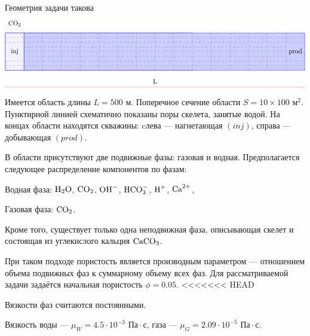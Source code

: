 \documentclass[14pt,a4paper]{extarticle}
\begin{document}
Геометрия задачи такова
$$
\tikz {
\draw (0,0) --  +(10,0) -- +(10,2) -- +(0, 2) -- +(0,0);
\filldraw[fill=blue!20!white, draw=blue] (1,0) --  (16,0) -- (16,2) -- (1, 2) -- (1,0);
\filldraw[fill=blue!5!white, draw=blue] (0,0) --  (1,0) -- (1,2) -- (0, 2) -- (0,0);
\draw[dashed, gray] (0,0.25) -- (16,0.25); 
\draw[dashed, gray] (0,0.5) -- (16,0.5); 
\draw[dashed, gray] (1,0.75) -- (15,0.75); 
\draw[dashed, gray] (1, 1) -- (15, 1);
\draw[dashed, gray] (1,1.25) -- (15,1.25); 
\draw[dashed, gray] (0,1.5) -- (16,1.5); 
\draw[dashed, gray] (0,1.75) -- (16,1.75);
\draw[dashed, gray] (1,0) -- (1,2); 
\draw[dashed, gray] (2,0) -- (2,2); 
\draw[dashed, gray] (3,0) -- (3,2); 
\draw[dashed, gray] (4,0) -- (4,2); 
\draw[dashed, gray] (5,0) -- (5,2); 
\draw[dashed, gray] (6,0) -- (6,2); 
\draw[dashed, gray] (7,0) -- (7,2); 
\draw[dashed, gray] (8,0) -- (8,2);
\draw[dashed, gray] (9,0) -- (9,2);
\draw[dashed, gray] (10,0) -- (10,2); 
\draw[dashed, gray] (11,0) -- (11,2); 
\draw[dashed, gray] (12,0) -- (12,2); 
\draw[dashed, gray] (13,0) -- (13,2); 
\draw[dashed, gray] (14,0) -- (14,2); 
\draw[dashed, gray] (15,0) -- (15,2);
\draw [<->, orange] (0, -0.9) -- (16, -0.9); 
\draw [->, blue!20!white] (0, 2.2) -- (1, 2.2);
\fill
(0.5,1) node {inj}
(15.5,1) node {prod} 
(8,-0.6) node {L}
(0.5, 2.5) node {$\CARB$}
}
$$
Имеется область длины $L = 500 \text{ м}$. Поперечное сечение области $S = 10\times100 \text{ м}^2$. Пунктирной линией схематично показаны поры скелета, занятые водой. На концах области находятся скважины: cлева --- нагнетающая $(inj)$, справа --- добывающая $(prod)$. 

В области присутствуют две подвижные фазы: газовая и водная.
Предполагается следующее распределение компонентов по фазам:

Водная фаза: $ \text{H}_2\text{O}$, $ \text{CO}_2$, $ \text{OH}^-$, $ \text{HCO}_3^{-}$, $ \text{H}^+$, $ \text{Ca}^{2+}$,

Газовая фаза: $\text{CO}_2 $.

Кроме того, существует только одна неподвижная фаза, описывающая скелет и состоящая из углекислого кальция $\text{CaCO}_3$.

При таком подходе пористость является производным параметром — отношением объема подвижных фаз к суммарному объему всех фаз.
Для рассматриваемой задачи задаётся начальная пористость $\phi = 0.05$.
<<<<<<< HEAD

Вязкости фаз считаются постоянными. 

Вязкость воды --- ${\mu}_W = 4.5 \cdot 10^{-3} \text{ Па} \cdot \text{с}$, газа --- $\mu_G = 2.09\cdot 10^{-5} \text{ Па} \cdot \text{с}$.
\end{document}
